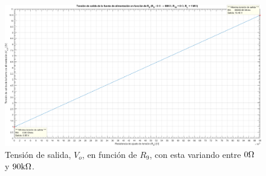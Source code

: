 \vfill

\clearpage

\begin{figure}[H] %
\begin{center}
\includegraphics[width=1.2 \textwidth, angle=90]{./img/preguntas/p21_6.png}
\caption{\label{fig:fig_p21_p6_output_voltage}\footnotesize{Tensión de salida, $V_{o}$, en función de $R_{9}$, con esta variando entre $0 \si[per-mode=symbol]{\ohm}$ y $90 \si[per-mode=symbol]{\kilo\ohm}$.}}
\end{center}
\end{figure}



\clearpage